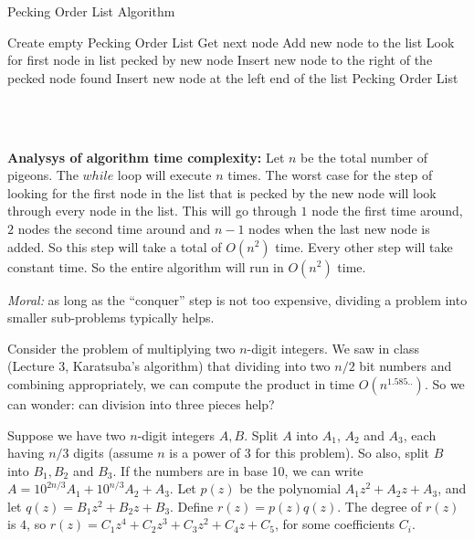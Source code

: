 \documentclass[addpoints]{exam}
\begin{document}
\begin{questions}
\begin{parts}
\let\oldReturn\Return
\renewcommand{\Return}{\State\oldReturn}

\begin{minipage}{\linewidth}
  \begin{algorithm}[H]
    \caption{Pecking Order List Algorithm}\label{AlgPeck}
    \begin{algorithmic}[1]
      	\State Create empty Pecking Order List
		\State Get next node
			\State Add new node to the list
		\Else
			\State Look for first node in list pecked by new node
				\State Insert new node to the right of the pecked node found
			\Else
				\State Insert new node at the left end of the list
			\EndIf
		\EndIf
	\EndWhile
	\Return Pecking Order List
      \EndProcedure
    \end{algorithmic}
  \end{algorithm}
\end{minipage}\\\\

\end{parts}

\textbf{Analysys of algorithm time complexity:}
Let $n$ be the total number of pigeons. The $while$ loop will execute $n$ times. The worst case for the step of looking for the first node in the list that is pecked by the new node will look through every node in the list. This will go through $1$ node the first time around, $2$ nodes the second time around and $n-1$ nodes when the last new node is added. So this step will take a total of $O(n^2)$ time. Every other step will take constant time. So the entire algorithm will run in $O(n^2)$ time.

\color{qcolor}
{\em Moral:} as long as the ``conquer'' step is not too expensive, dividing a problem into smaller sub-problems typically helps. 

Consider the problem of multiplying two $n$-digit integers.  We saw in class (Lecture 3, Karatsuba's algorithm) that dividing into two $n/2$ bit numbers and combining appropriately, we can compute the product in time $O(n^{1.585..})$. So we can wonder: can division into three pieces help?

Suppose we have two $n$-digit integers $A, B$. Split $A$ into $A_1$,  $A_2$ and $A_3$, each having $n/3$ digits (assume $n$ is a power of $3$ for this problem). So also, split $B$ into $B_1, B_2$ and $B_3$. If the numbers are in base 10, we can write $A = 10^{2n/3} A_1 + 10^{n/3} A_2 + A_3$.  Let $p(z)$ be the polynomial $A_1 z^2 + A_2 z + A_3$, and let $q(z) = B_1 z^2 + B_2 z + B_3$.  Define $r(z) = p(z) q(z)$.  The degree of $r(z)$ is $4$, so $r(z) = C_1 z^4 + C_2 z^3 + C_3 z^2 + C_4 z + C_5$, for some coefficients $C_i$.  


\end{questions}
\end{document}
